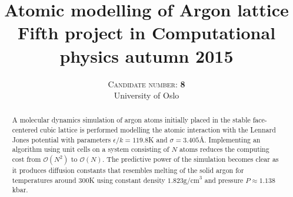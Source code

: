 \documentclass[twoside,utf8]{article}
\title{\vspace{-15mm}\fontsize{24pt}{10pt}\selectfont\textbf{
Atomic modelling of Argon lattice \\ 
\normalsize Fifth project in Computational physics autumn 2015
}} %
\author{
\large
\textsc{Candidate number: \textbf{8}} \\
\normalsize University of Oslo \\ %
\vspace{-5mm}
}
\date{}
\begin{document}
\maketitle %


\small
\begin{abstract}

\noindent
A molecular dynamics simulation of argon atoms initially placed in the stable face-centered cubic lattice is performed modelling the atomic interaction with the Lennard Jones potential with parameters $\epsilon/k=119.8$K and $\sigma=3.405$\r{A}. Implementing an algorithm using unit cells on a system consisting of $N$ atoms reduces the computing cost from $\mathcal{O}(N^2)$ to $\mathcal{O}(N)$.
The predictive power of the simulation becomes clear as it produces diffusion constants that resembles melting of the solid argon for temperatures around $300$K using constant density $1.823\text{g/cm}^3$ and pressure $P\approx 1.138$kbar. 


\end{abstract}

\end{document}
